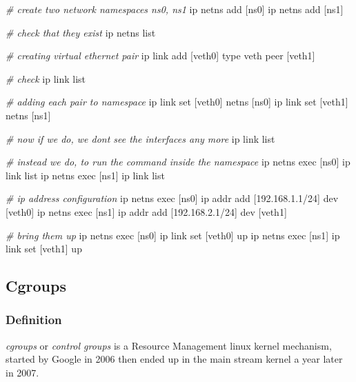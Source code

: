 \documentclass[
  14pt,
  english,
  a4paper,
]{scrreprt}
\newenvironment{Shaded}{}{}
\newcommand{\CommentTok}[1]{\textcolor[rgb]{0.38,0.63,0.69}{\textit{#1}}}
\newcommand{\ExtensionTok}[1]{#1}
\newcommand{\KeywordTok}[1]{\textcolor[rgb]{0.00,0.44,0.13}{\textbf{#1}}}
\newcommand{\NormalTok}[1]{#1}
\begin{document}
\begin{Shaded}
\begin{Highlighting}[]
\CommentTok{\# create two network namespaces ns0, ns1}
\ExtensionTok{ip}\NormalTok{ netns add [ns0]}
\ExtensionTok{ip}\NormalTok{ netns add [ns1]}

\CommentTok{\# check that they exist}
\ExtensionTok{ip}\NormalTok{ netns list}

\CommentTok{\# creating virtual ethernet pair}
\ExtensionTok{ip}\NormalTok{ link add [veth0] type veth peer [veth1]}

\CommentTok{\# check}
\ExtensionTok{ip}\NormalTok{ link list}

\CommentTok{\# adding each pair to namespace}
\ExtensionTok{ip}\NormalTok{ link set [veth0] netns [ns0]}
\ExtensionTok{ip}\NormalTok{ link set [veth1] netns [ns1]}

\CommentTok{\# now if we do, we don\textquotesingle{}t see the interfaces any more}
\ExtensionTok{ip}\NormalTok{ link list}

\CommentTok{\# instead we do, to run the command inside the namespace}
\ExtensionTok{ip}\NormalTok{ netns exec [ns0] ip link list}
\ExtensionTok{ip}\NormalTok{ netns exec [ns1] ip link list}

\CommentTok{\# ip address configuration}
\ExtensionTok{ip}\NormalTok{ netns exec [ns0] ip addr add [192.168.1.1/24] dev [veth0]}
\ExtensionTok{ip}\NormalTok{ netns exec [ns1] ip addr add [192.168.2.1/24] dev [veth1]}

\CommentTok{\# bring them up}
\ExtensionTok{ip}\NormalTok{ netns exec [ns0] ip link set [veth0] up}\KeywordTok{\textasciigrave{}}
\ExtensionTok{ip}\NormalTok{ netns exec [ns1] ip link set [veth1] up}
\end{Highlighting}
\end{Shaded}

\hypertarget{cgroups}{%
\subsection{Cgroups}\label{cgroups}}

\hypertarget{definition-4}{%
\subsubsection{Definition}\label{definition-4}}

\emph{cgroups} or \emph{control groups} is a Resource Management linux
kernel mechanism, started by Google in 2006 then ended up in the main
stream kernel a year later in 2007.
\end{document}
